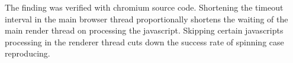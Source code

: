 The finding was verified with chromium source code. Shortening the timeout interval
in the main browser thread proportionally shortens the waiting of the main
render thread on processing the javascript. Skipping certain javascripts
processing in the renderer thread cuts down the success rate of spinning case
reproducing.


